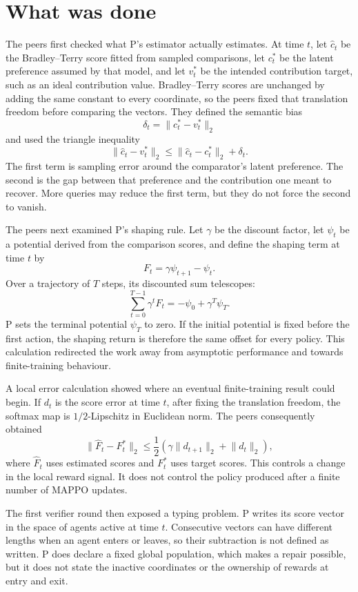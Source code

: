 \documentclass{article}
\begin{document}
\section{What was done}

The peers first checked what P's estimator actually estimates. At time $t$, let $\widehat c_t$ be the Bradley--Terry score fitted from sampled comparisons, let $c_t^*$ be the latent preference assumed by that model, and let $v_t^*$ be the intended contribution target, such as an ideal contribution value. Bradley--Terry scores are unchanged by adding the same constant to every coordinate, so the peers fixed that translation freedom before comparing the vectors. They defined the semantic bias
\[
  \delta_t=\lVert c_t^*-v_t^*\rVert_2
\]
and used the triangle inequality
\[
  \lVert\widehat c_t-v_t^*\rVert_2
  \leq \lVert\widehat c_t-c_t^*\rVert_2+\delta_t.
\]
The first term is sampling error around the comparator's latent preference. The second is the gap between that preference and the contribution one meant to recover. More queries may reduce the first term, but they do not force the second to vanish.

The peers next examined P's shaping rule. Let $\gamma$ be the discount factor, let $\psi_t$ be a potential derived from the comparison scores, and define the shaping term at time $t$ by
\[
  F_t=\gamma\psi_{t+1}-\psi_t.
\]
Over a trajectory of $T$ steps, its discounted sum telescopes:
\[
  \sum_{t=0}^{T-1}\gamma^tF_t=-\psi_0+\gamma^T\psi_T.
\]
P sets the terminal potential $\psi_T$ to zero. If the initial potential is fixed before the first action, the shaping return is therefore the same offset for every policy. This calculation redirected the work away from asymptotic performance and towards finite-training behaviour.

A local error calculation showed where an eventual finite-training result could begin. If $d_t$ is the score error at time $t$, after fixing the translation freedom, the softmax map is $1/2$-Lipschitz in Euclidean norm. The peers consequently obtained
\[
 \lVert \widehat F_t-F_t^*\rVert_2
 \leq \frac{1}{2}\left(
 \gamma\lVert d_{t+1}\rVert_2+\lVert d_t\rVert_2
 \right),
\]
where $\widehat F_t$ uses estimated scores and $F_t^*$ uses target scores. This controls a change in the local reward signal. It does not control the policy produced after a finite number of MAPPO updates.

The first verifier round then exposed a typing problem. P writes its score vector in the space of agents active at time $t$. Consecutive vectors can have different lengths when an agent enters or leaves, so their subtraction is not defined as written. P does declare a fixed global population, which makes a repair possible, but it does not state the inactive coordinates or the ownership of rewards at entry and exit.
\end{document}
